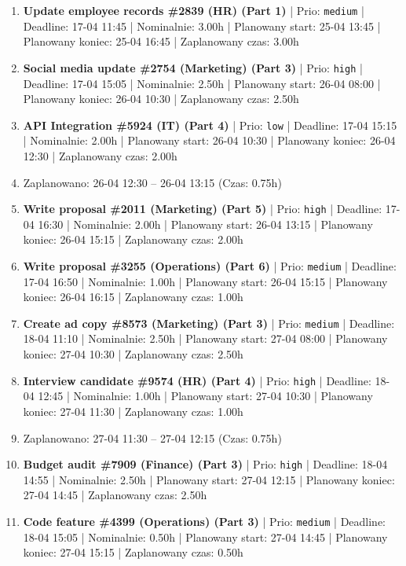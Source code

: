 {\begin{enumerate}
  \item [\textbf{14670}] \textbf{Update employee records \#2839 (HR) (Part 1)} | Prio: \texttt{medium} | Deadline: 17-04 11:45 | Nominalnie: 3.00h | Planowany start: 25-04 13:45 | Planowany koniec: 25-04 16:45 | Zaplanowany czas: 3.00h
  \item [\textbf{14611}] \textbf{Social media update \#2754 (Marketing) (Part 3)} | Prio: \texttt{high} | Deadline: 17-04 15:05 | Nominalnie: 2.50h | Planowany start: 26-04 08:00 | Planowany koniec: 26-04 10:30 | Zaplanowany czas: 2.50h
  \item [\textbf{14696}] \textbf{API Integration \#5924 (IT) (Part 4)} | Prio: \texttt{low} | Deadline: 17-04 15:15 | Nominalnie: 2.00h | Planowany start: 26-04 10:30 | Planowany koniec: 26-04 12:30 | Zaplanowany czas: 2.00h
  \item [\textbf{PRZERWA}] Zaplanowano: 26-04 12:30 -- 26-04 13:15 (Czas: 0.75h)
  \item [\textbf{14628}] \textbf{Write proposal \#2011 (Marketing) (Part 5)} | Prio: \texttt{high} | Deadline: 17-04 16:30 | Nominalnie: 2.00h | Planowany start: 26-04 13:15 | Planowany koniec: 26-04 15:15 | Zaplanowany czas: 2.00h
  \item [\textbf{14654}] \textbf{Write proposal \#3255 (Operations) (Part 6)} | Prio: \texttt{medium} | Deadline: 17-04 16:50 | Nominalnie: 1.00h | Planowany start: 26-04 15:15 | Planowany koniec: 26-04 16:15 | Zaplanowany czas: 1.00h
  \item [\textbf{14677}] \textbf{Create ad copy \#8573 (Marketing) (Part 3)} | Prio: \texttt{medium} | Deadline: 18-04 11:10 | Nominalnie: 2.50h | Planowany start: 27-04 08:00 | Planowany koniec: 27-04 10:30 | Zaplanowany czas: 2.50h
  \item [\textbf{14612}] \textbf{Interview candidate \#9574 (HR) (Part 4)} | Prio: \texttt{high} | Deadline: 18-04 12:45 | Nominalnie: 1.00h | Planowany start: 27-04 10:30 | Planowany koniec: 27-04 11:30 | Zaplanowany czas: 1.00h
  \item [\textbf{PRZERWA}] Zaplanowano: 27-04 11:30 -- 27-04 12:15 (Czas: 0.75h)
  \item [\textbf{14616}] \textbf{Budget audit \#7909 (Finance) (Part 3)} | Prio: \texttt{high} | Deadline: 18-04 14:55 | Nominalnie: 2.50h | Planowany start: 27-04 12:15 | Planowany koniec: 27-04 14:45 | Zaplanowany czas: 2.50h
  \item [\textbf{14664}] \textbf{Code feature \#4399 (Operations) (Part 3)} | Prio: \texttt{medium} | Deadline: 18-04 15:05 | Nominalnie: 0.50h | Planowany start: 27-04 14:45 | Planowany koniec: 27-04 15:15 | Zaplanowany czas: 0.50h

\end{enumerate}}
